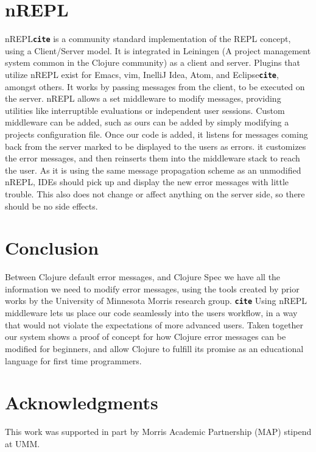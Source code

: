 \documentclass[12pt]{article}
\newcommand{\comment}[1]{{\bf \tt  {#1}}}
\begin{document}
\section{nREPL}
nREPL\comment{cite} is a community standard implementation of the REPL concept,
 using a Client/Server model. It is integrated in Leiningen
 (A project management system common in the Clojure community) as a client and server.
 Plugins that utilize nREPL exist for Emacs, vim, InelliJ Idea, Atom, and Eclipse\comment{cite}, amongst others.
It works by passing messages from the client, to be executed on the server.
nREPL allows a set middleware to modify messages, providing utilities
like interruptible evaluations or independent user sessions.
Custom middleware can be added, such as ours can be added by simply
modifying a projects configuration file. Once our code is added,
it listens for messages coming back from the server
marked to be displayed to the users as errors.
it customizes the error messages, and then reinserts them into the middleware stack
to reach the user. As it is using the same message propagation scheme as an unmodified nREPL,
IDEs should pick up and display the new error messages with little trouble.
This also does not change or affect anything on the server side, so there should
be no side effects.

\section{Conclusion}
Between Clojure default error messages, and Clojure Spec
we have all the information we need to modify error messages, using the
tools created by prior works by the University of Minnesota Morris research group. \comment{cite}
Using nREPL middleware lets us place our code seamlessly into the users
workflow, in a way that would not violate the expectations of more advanced users.
 Taken together our system shows a proof of concept for how Clojure
error messages can be modified for beginners, and allow Clojure to fulfill
its promise as an educational language for first time programmers.

\section{Acknowledgments}
This work was supported in part by Morris Academic Partnership (MAP) stipend at UMM.




\end{document}
